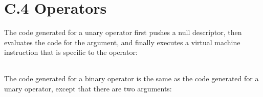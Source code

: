 \begin{noIndex}
\begin{flushleft}
\begin{xtabular}{|m{1.9066598in}|m{2.75596in}|}
\end{xtabular}
\end{flushleft}

\bigskip

\begin{flushleft}
\tablelasttail{\hline}
\begin{xtabular}{|m{1.9066598in}|m{2.75596in}|}

\end{xtabular}
\end{flushleft}


\section[C.4 Operators]{C.4 Operators}

The code generated for a unary operator first pushes a null
descriptor, then evaluates the code for the argument, and finally
executes a virtual machine instruction that is specific to the
operator:

\begin{flushleft}
\tablelasttail{\hline}
\begin{xtabular}{|m{1.9066598in}|m{2.75596in}|}

\end{xtabular}
\end{flushleft}

The code generated for a binary operator is the same as the code
generated for a unary operator, except that there are two arguments:

\begin{flushleft}
\tablelasttail{\hline}
\begin{xtabular}{|m{1.9066598in}|m{2.75596in}|}

\end{xtabular}
\end{flushleft}


\end{noIndex}
